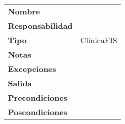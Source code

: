 \begin{table}[H]
\centering
\label{my-label}
\begin{tabularx}{\textwidth}{l|X}
\textbf{Nombre}          & \\
\textbf{Responsabilidad} & \\
\textbf{Tipo}            & ClinicaFIS \\
\textbf{Notas}           &  \\
\textbf{Excepciones}     &  \\
\textbf{Salida}          &  \\
\textbf{Precondiciones}  &  \\
\textbf{Poscondiciones}  &  \\
\end{tabularx}
\end{table}